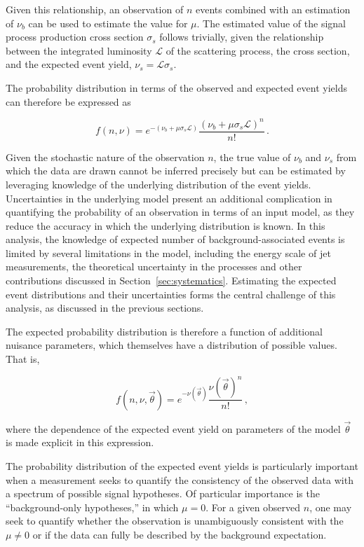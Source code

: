 Given this relationship, an observation of $n$ events
combined with an estimation of $\nu_{b}$ can be used to estimate 
the value for $\mu$. The estimated value of the signal process
production cross section $\sigma_{s}$ follows trivially, given the relationship 
between the integrated luminosity $\mathcal{L}$ of the scattering process, the cross section,
and the expected event yield, $\nu_s = \mathcal{L}\sigma_{s}$.

The probability distribution in terms of the 
observed and expected event yields can therefore be expressed as

\begin{equation}
  f(n, \nu) = e^{-(\nu_{b} + \mu\sigma_{s}\mathcal{L})}\frac{(\nu_{b} + \mu\sigma_{s}\mathcal{L})^{n}}{n!} \,.
\end{equation}

Given the stochastic nature of the observation $n$, the 
true value of $\nu_b$ and $\nu_s$ from which the data are drawn cannot be inferred precisely
but can be estimated by
leveraging knowledge of the underlying distribution of the event yields.
Uncertainties in the underlying model present an additional complication
in quantifying the probability of an observation in terms of an input model,
as they reduce the accuracy in which the underlying distribution is known.
In this analysis, the knowledge of expected number of background-associated events
is limited by several limitations in the model, including the energy
scale of jet measurements, the theoretical uncertainty in the \WZ processes
and other contributions discussed in Section~\ref{sec:systematics}.
Estimating the expected event distributions and their uncertainties 
forms the central challenge of this analysis, as discussed in the
previous sections.

The expected probability distribution is therefore a function of additional
nuisance parameters, which themselves have a distribution of possible values.
That is, 

\begin{equation}
  f(n, \nu, \vec{\theta}) = e^{-\nu(\vec{\theta})}\frac{\nu(\vec{\theta})^{n}}{n!} \,,
\end{equation}

where the dependence of the expected event yield on parameters 
of the model $\vec{\theta}$ is made explicit in this expression.

The probability distribution of the expected event yields is particularly important
when a measurement seeks to quantify the consistency of the observed data
with a spectrum of possible signal hypotheses. 
Of particular importance is the 
``background-only hypotheses,'' in which $\mu = 0$. For a given observed
$n$, one may seek to quantify whether the observation is unambiguously
consistent with the $\mu \ne 0$ or if the data can fully be described by
the background expectation. 


